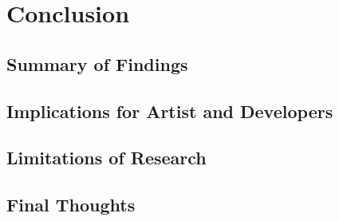 \chapter{Conclusion}
    \section{Summary of Findings}
    \section{Implications for Artist and Developers}
    \section{Limitations of Research}
    \section{Final Thoughts}